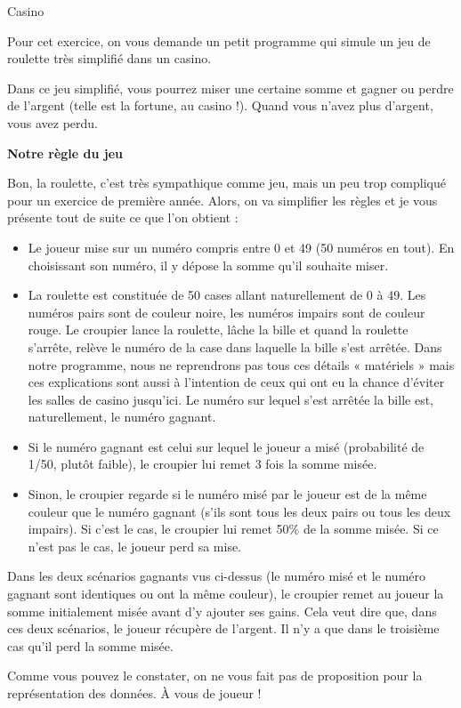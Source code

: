 \begin{Exercice}{Casino}

	Pour cet exercice,
	on vous demande un petit programme qui simule un jeu de roulette
	très simplifié dans un casino.
	
	Dans ce jeu simplifié, vous pourrez miser une certaine somme 
	et gagner ou perdre de l'argent (telle est la fortune, au casino !). 
	Quand vous n'avez plus d'argent, vous avez perdu.

	\textbf{Notre règle du jeu}

	Bon, la roulette, c'est très sympathique comme jeu, 
	mais un peu trop compliqué pour un exercice de première année.
	Alors, on va simplifier les règles et je vous présente tout de suite 
	ce que l'on obtient :
	\begin{itemize}
	\item
		Le joueur mise sur un numéro compris entre 0 et 49 (50 numéros en tout). 
		En choisissant son numéro, il y dépose la somme qu'il souhaite miser.
	\item
		La roulette est constituée de 50 cases allant naturellement de 0 à 49. 
		Les numéros pairs sont de couleur noire, 
		les numéros impairs sont de couleur rouge. 
		Le croupier lance la roulette, 
		lâche la bille et quand la roulette s'arrête, 
		relève le numéro de la case dans laquelle la bille s'est arrêtée. 
		Dans notre programme, nous ne reprendrons pas tous ces détails 
		« matériels » mais ces explications sont aussi à l'intention 
		de ceux qui ont eu la chance d'éviter les salles de casino jusqu'ici. 
		Le numéro sur lequel s'est arrêtée la bille est, naturellement, 
		le numéro gagnant.
	\item
		Si le numéro gagnant est celui sur lequel le joueur a misé 
		(probabilité de 1/50, plutôt faible), 
		le croupier lui remet 3 fois la somme misée.
	\item
		Sinon, le croupier regarde si le numéro misé par le joueur 
		est de la même couleur que le numéro gagnant 
		(s'ils sont tous les deux pairs ou tous les deux impairs). 
		Si c'est le cas, le croupier lui remet 50\% de la somme misée. 
		Si ce n'est pas le cas, le joueur perd sa mise.
	\end{itemize}
	
	Dans les deux scénarios gagnants vus ci-dessus 
	(le numéro misé et le numéro gagnant sont identiques ou ont la même couleur), 
	le croupier remet au joueur la somme initialement misée avant d'y ajouter ses gains. 
	Cela veut dire que, dans ces deux scénarios, le joueur récupère de l'argent. 
	Il n'y a que dans le troisième cas qu'il perd la somme misée.
	
	Comme vous pouvez le constater,
	on ne vous fait pas de proposition pour la représentation des données.
	À vous de joueur !
\end{Exercice}

